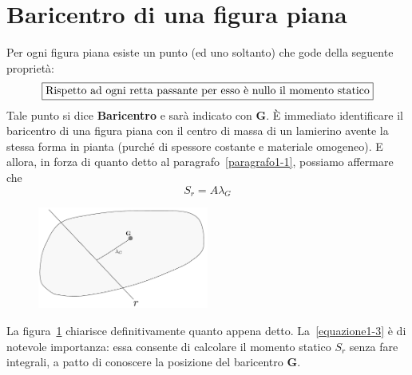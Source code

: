 \section{Baricentro di una figura piana}
Per ogni figura piana esiste un punto (ed uno soltanto) che gode della seguente proprietà:
\begin{equation*} 
\boxed{\textup{Rispetto ad ogni retta passante per esso è nullo il momento statico}}
\end{equation*}
Tale punto si dice \textbf{Baricentro} e sarà indicato con $\mathbf{G}$. 
È immediato identificare il baricentro di una figura piana con il centro di massa di un lamierino avente la stessa forma in pianta (purché di spessore costante e materiale omogeneo). E allora, in forza di quanto detto al paragrafo~\vref{paragrafo1-1}, possiamo affermare che 
\begin{equation} 
\label{equazione1-3}
\boxed{S_r = A\lambda_G}
\tag{1.3}
\end{equation}
\renewcommand{\thefigure}{1~-~4}
\begin{figure}[h]
\centering
\includegraphics[width=0.5\textwidth]{Immagini/Parte_1/Figura1_4/Figura1_4.pdf}
\caption{}
\label{figura1-4}
\end{figure}
La figura~\ref{figura1-4} chiarisce definitivamente quanto appena detto. La~\eqref{equazione1-3} è di notevole importanza: essa consente di calcolare il momento statico $S_r$ senza fare integrali, a patto di conoscere la posizione del baricentro $\mathbf{G}$. 

